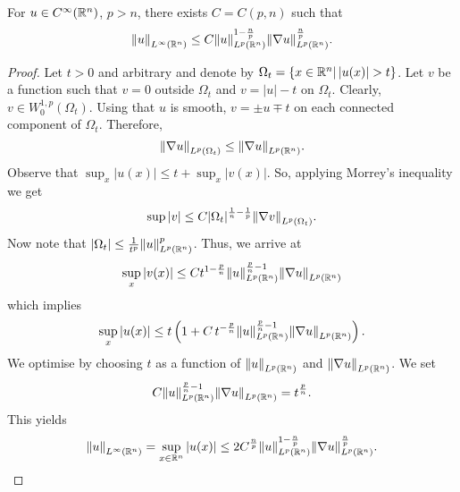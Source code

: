 \documentclass[11pt]{article}
\begin{document}
    		\begin{cor}
    			For $u\in C^\infty(\mathbb{R}^n)$, $p>n$, there exists $C=C(p,n)$ such that
    			\begin{equation*}
    				\norm{u}_{L^\infty(\mathbb{R}^n)}\le C\norm{u}^{1-\frac{n}{p}}_{L^p(\mathbb{R}^n)}\norm{\nabla u}^{\frac{n}{p}}_{L^p(\mathbb{R}^n)}.
    			\end{equation*}
    		\end{cor}
    		\begin{proof}
    			Let $t>0$ and arbitrary and denote by $\Omega_t=\{x\in\R^n|\,|u(x)|>t\}$. Let $v$ be a function such that $v=0$ outside $\Omega_t$ and $v=|u|-t$ on $\Omega_t$. Clearly, $v\in W^{1,p}_0(\Omega_t)$. Using that $u$ is smooth, $v=\pm u\mp t$ on each connected component of $\Omega_t$. Therefore,
    			\begin{equation*}
    				\norm{\nabla u}_{L^p(\Omega_t)}\le\norm{\nabla u}_{L^p(\mathbb{R}^n)}.
    			\end{equation*}
    			Observe that $\sup_x|u(x)|\le t+\sup_x|v(x)|$. So, applying Morrey's inequality we get 
    			\begin{equation*}
    				\sup|v|\le C|\Omega_t|^{\frac{1}{n}-\frac{1}{p}}\norm{\nabla v}_{L^p(\Omega_t)}.
    			\end{equation*}
    			Now note that $|\Omega_t|\le\frac{1}{t^p}\norm{u}^p_{L^p(\mathbb{R}^n)}$. Thus, we arrive at
    			\begin{equation*}
    				\sup_x|v(x)|\le C t^{1-\frac{p}{n}}\norm{u}^{\frac{p}{n}-1}_{L^p(\mathbb{R}^n)}\norm{\nabla u}_{L^p(\mathbb{R}^n)}
    			\end{equation*}
    			which implies
    			\begin{equation*}
    				\sup_x|u(x)|\le t\left(1+C\, t^{-\frac{p}{n}}\norm{u}^{\frac{p}{n}-1}_{L^p(\mathbb{R}^n)}\norm{\nabla u}_{L^p(\mathbb{R}^n)}\right).
    			\end{equation*}
    			We optimise by choosing $t$ as a function of $\norm{u}_{L^p(\mathbb{R}^n)}$ and $\norm{\nabla u}_{L^p(\mathbb{R}^n)}$. We set 
    			\begin{equation*}
    				C\norm{u}^{\frac{p}{n}-1}_{L^p(\mathbb{R}^n)}\norm{\nabla u}_{L^p(\mathbb{R}^n)}=t^{\frac{p}{n}}.
    			\end{equation*} 
    			This yields
    			\begin{equation*}
    					\norm{u}_{L^\infty(\mathbb{R}^n)}=\sup_{x\in\mathbb{R}^n}|u(x)|\le 2C^{\frac{n}{p}}\norm{u}^{1-\frac{n}{p}}_{L^p(\mathbb{R}^n)}\norm{\nabla u}^{\frac{n}{p}}_{L^p(\mathbb{R}^n)}.
    			\end{equation*}
    		\end{proof}
    
\end{document}

